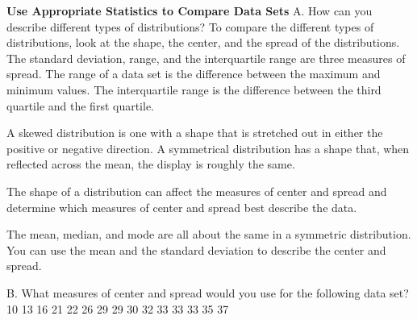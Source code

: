 \documentclass{article}
\newenvironment{example}[1]{}{}         %
\newcommand{\answer}[1]{}               %
\newcommand{\placeholder}[2]{}          %
\newcommand{\te}[1]{}                   %
\begin{document}
\begin{example}{2}
\textbf{Use Appropriate Statistics to Compare Data Sets}
A. How can you describe different types of distributions?
To compare the different types of distributions, look at the shape, the center, and the spread of the distributions.
The standard deviation, range, and the interquartile range are three measures of spread. The range of a data set is the difference between the maximum and minimum values. The interquartile range is the difference between the third quartile and the first quartile.
\te{Callout: When measuring center and spread, median and interquartile range are used together, and mean and standard deviation are used together.}
A skewed distribution is one with a shape that is stretched out in either the positive or negative direction. A symmetrical distribution has a shape that, when reflected across the mean, the display is roughly the same.
\te{LEARN TOGETHER How can you respectfully disagree and manage your emotions?}
The shape of a distribution can affect the measures of center and spread and determine which measures of center and spread best describe the data.
\placeholder{graph}{Skewed left red curve with long left tail, unscaled horizontal axis and vertical Frequency axis, positive arrowheads. Dashed blue vertical lines from left to right are Mean, Median, Mode, with Mode at peak. Leftward arrow below labeled Negative direction.}
\placeholder{graph}{Symmetric red bell curve with blue dashed vertical line at center and peak labeled Mean Median Mode. Unscaled axes with positive arrowheads. Caption: The graph looks the same on both sides.}
\placeholder{graph}{Skewed right red curve with long right tail. Unscaled axes with positive arrowheads. Blue dashed lines left to right Mode at peak, Median, Mean. Rightward arrow below labeled Positive direction.}
The mean, median, and mode are all about the same in a symmetric distribution. You can use the mean and the standard deviation to describe the center and spread.
\answer{A. Compare the shape, center, and spread; use mean and standard deviation for a symmetric distribution and median and interquartile range for a skewed distribution.}
\te{Printed statement that mean, median, and mode are all about the same for a symmetric distribution assumes the single central peak illustrated; it need not hold for every symmetric distribution.}
B. What measures of center and spread would you use for the following data set?
10 13 16 21 22 26 29 29 30 32 33 33 33 35 37

\end{example}
\end{document}
